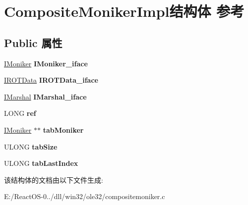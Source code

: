 \hypertarget{struct_composite_moniker_impl}{}\section{Composite\+Moniker\+Impl结构体 参考}
\label{struct_composite_moniker_impl}
\subsection*{Public 属性}
\begin{DoxyCompactItemize}
\item 
\mbox{\label{struct_composite_moniker_impl_a3e7ab2cc4ef693141d6587099ba0de3c}} 
\hyperlink{interface_i_moniker}{I\+Moniker} {\bfseries I\+Moniker\+\_\+iface}
\item 
\mbox{\label{struct_composite_moniker_impl_a25f830820d1ba9e882a1355d038f9a8b}} 
\hyperlink{interface_i_r_o_t_data}{I\+R\+O\+T\+Data} {\bfseries I\+R\+O\+T\+Data\+\_\+iface}
\item 
\mbox{\label{struct_composite_moniker_impl_a724de55c06aea1a635776105c2dd0a12}} 
\hyperlink{interface_i_marshal}{I\+Marshal} {\bfseries I\+Marshal\+\_\+iface}
\item 
\mbox{\label{struct_composite_moniker_impl_a488a259db9047d11ca90466b12f11049}} 
L\+O\+NG {\bfseries ref}
\item 
\mbox{\label{struct_composite_moniker_impl_ad25befa032c3769f9580f825c36cc94f}} 
\hyperlink{interface_i_moniker}{I\+Moniker} $\ast$$\ast$ {\bfseries tab\+Moniker}
\item 
\mbox{\label{struct_composite_moniker_impl_afad55e0b941f4e10d81f3952a92b3bca}} 
U\+L\+O\+NG {\bfseries tab\+Size}
\item 
\mbox{\label{struct_composite_moniker_impl_a9239f234524f145382093db43774e85f}} 
U\+L\+O\+NG {\bfseries tab\+Last\+Index}
\end{DoxyCompactItemize}


该结构体的文档由以下文件生成\+:\begin{DoxyCompactItemize}
\item 
E\+:/\+React\+O\+S-\/0../dll/win32/ole32/compositemoniker.\+c\end{DoxyCompactItemize}
